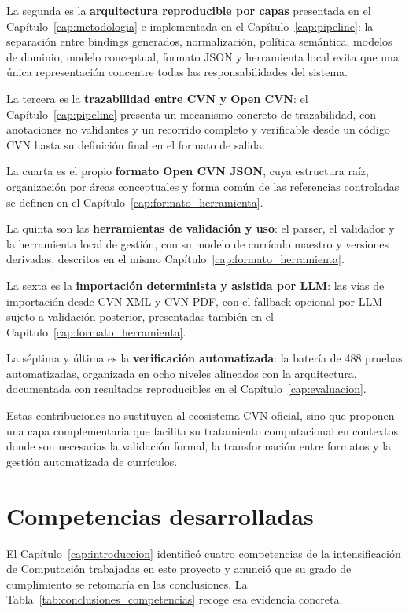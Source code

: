 La segunda es la \textbf{arquitectura reproducible por capas} presentada en
el Capítulo~\ref{cap:metodologia} e implementada en el
Capítulo~\ref{cap:pipeline}: la separación entre bindings generados,
normalización, política semántica, modelos de dominio, modelo conceptual,
formato JSON y herramienta local evita que una única representación
concentre todas las responsabilidades del sistema.

La tercera es la \textbf{trazabilidad entre CVN y Open CVN}: el
Capítulo~\ref{cap:pipeline} presenta un mecanismo concreto de trazabilidad,
con anotaciones no validantes y un recorrido completo y verificable desde
un código CVN hasta su definición final en el formato de salida.

La cuarta es el propio \textbf{formato Open CVN JSON}, cuya estructura raíz,
organización por áreas conceptuales y forma común de las referencias
controladas se definen en el Capítulo~\ref{cap:formato_herramienta}.

La quinta son las \textbf{herramientas de validación y uso}: el parser, el
validador y la herramienta local de gestión, con su modelo de currículo
maestro y versiones derivadas, descritos en el mismo
Capítulo~\ref{cap:formato_herramienta}.

La sexta es la \textbf{importación determinista y asistida por LLM}: las
vías de importación desde CVN XML y CVN PDF, con el fallback opcional por
LLM sujeto a validación posterior, presentadas también en el
Capítulo~\ref{cap:formato_herramienta}.

La séptima y última es la \textbf{verificación automatizada}: la batería
de 488 pruebas automatizadas, organizada en ocho niveles alineados con la
arquitectura, documentada con resultados reproducibles en el
Capítulo~\ref{cap:evaluacion}.

Estas contribuciones no sustituyen al ecosistema CVN oficial, sino que
proponen una capa complementaria que facilita su tratamiento computacional
en contextos donde son necesarias la validación formal, la transformación
entre formatos y la gestión automatizada de currículos.

\section{Competencias desarrolladas}
\label{sec:conclusiones_competencias}

El Capítulo~\ref{cap:introduccion} identificó cuatro competencias de la
intensificación de Computación trabajadas en este proyecto y anunció que su
grado de cumplimiento se retomaría en las conclusiones. La
Tabla~\ref{tab:conclusiones_competencias} recoge esa evidencia concreta.

